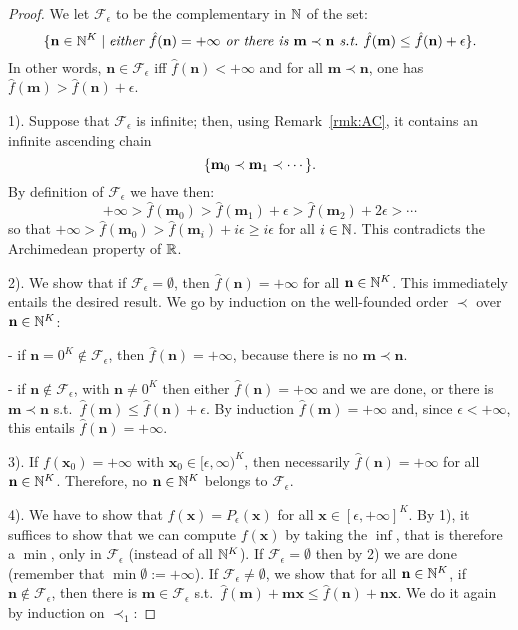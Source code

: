 \begin{proof}
We let $\mathcal F_\epsilon$ to be the complementary in $\mathbb{N}$ of the set:
\[
 \{\mathbf n\in\mathbb{N}^{K} \mid \textit{either } \hat f (\mathbf n)=+\infty \textit{ or there is } \mathbf m\prec \mathbf n\textit{ s.t.\ } \hat f(\mathbf m)\leq\hat f(\mathbf n)+\epsilon\}.
\]
In other words, $\mathbf n\in\mathcal F_\epsilon$ iff $\hat f(\mathbf n)<+\infty$ and for all $\mathbf m\prec \mathbf n$, one has $\hat f(\mathbf m)>\hat f(\mathbf n)+\epsilon$.

1).
Suppose that $\mathcal F_\epsilon$ is infinite; then, using Remark~\ref{rmk:AC}, it contains an infinite ascending chain
\[\{\mathbf m_0\prec \mathbf m_1\prec\cdots\}.\]
By definition of $\mathcal F_\epsilon$ we have then:
\[+\infty>\hat f(\mathbf m_0)>\hat f(\mathbf m_1)+\epsilon>\hat f(\mathbf m_2)+2\epsilon>\cdots\]
so that $+\infty>\hat f(\mathbf m_0)>\hat f(\mathbf m_{i})+i\epsilon\geq i\epsilon$ for all $i\in\mathbb{N}$.
This contradicts the Archimedean property of $\mathbb{R}$.

2).
We show that if $\mathcal F_\epsilon=\emptyset$, then $\hat f(\mathbf n)=+\infty$ for all $\mathbf n\in\mathbb{N}^{K}$.
This immediately entails the desired result.
We go by induction on the well-founded order $\prec$ over $\mathbf n\in\mathbb{N}^{K}$:

- if $\mathbf n=0^{K}\notin\mathcal F_\epsilon$, then $\hat f(\mathbf n)=+\infty$, because there is no $\mathbf m\prec\mathbf n$.

- if $\mathbf n\notin\mathcal F_\epsilon$, with $\mathbf n\neq 0^{K}$ then either $\hat f(\mathbf n)=+\infty$ and we are done, or there is $\mathbf m\prec \mathbf n$ s.t.\ $\hat f(\mathbf m)\leq \hat f(\mathbf n)+\epsilon$.
By induction $\hat f(\mathbf m)=+\infty$ and, since $\epsilon<+\infty$, this entails $\hat f(\mathbf n)=+\infty$.

3).
If $f(\mathbf x_0)=+\infty$ with $\mathbf x_0\in [\epsilon,\infty)^{K}$, then necessarily $\hat f(\mathbf n)=+\infty$ for all $\mathbf n\in\mathbb{N}^{K}$.
Therefore, no $\mathbf n\in\mathbb{N}^{K}$ belongs to $\mathcal F_\epsilon$.

4).
We have to show that $f(\mathbf x)=P_\epsilon(\mathbf x)$ for all $\mathbf x\in [\epsilon,+\infty]^{K}$.
By 1), it suffices to show that we can compute $f(\mathbf x)$ by taking the $\inf$, that is therefore a $\min$, only in $\mathcal F_\epsilon$ (instead of all $\mathbb{N}^{K}$).
If $\mathcal F_\epsilon=\emptyset$ then by 2) we are done (remember that $\min\emptyset := +\infty$).
If $\mathcal F_\epsilon\neq\emptyset$, we show that for all $\mathbf n\in\mathbb{N}^{K}$, if $\mathbf n \notin\mathcal F_\epsilon$, then there is $\mathbf m\in\mathcal F_\epsilon$ s.t.\ $\hat f(\mathbf m)+\mathbf m\mathbf x \leq \hat f(\mathbf n)+\mathbf n\mathbf x$.
We do it again by induction on $\prec_{1}$:


\end{proof}
